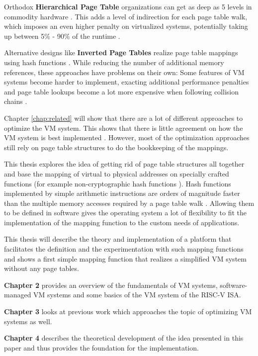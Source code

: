 Orthodox \textbf{Hierarchical Page Table} organizations \cite{tanenbaumOS} can get as deep as 5 levels in commodity hardware \cite{intel5LevelPaging5Level2017}. This adds a level of indirection for each page table walk, which imposes an even higher penalty on virtualized systems, potentially taking up between 5\% - 90\% of the runtime \cite{yaniv2016hash}.

Alternative designs like \textbf{Inverted Page Tables} realize page table mappings using hash functions \cite{tanenbaumOS}. While reducing the number of additional memory references, these approaches have problems on their own: Some features of VM systems become harder to implement, exacting additional performance penalties \cite{yaniv2016hash} and page table lookups become a lot more expensive when following collision chains \cite{jacob1998look}.

Chapter \ref{chap:related} will show that there are a lot of different approaches to optimize the VM system.
This shows that there is little agreement on how the VM system is best implemented \cite{jacob1998look}.
However, most of the optimization approaches still rely on page table structures to do the bookkeeping of the mappings.

This thesis explores the idea of getting rid of page table structures all together and base the mapping of virtual to physical addresses on specially crafted functions (for example non-cryptographic hash functions \cite{mittelbach2021non}).
Hash functions implemented by simple arithmetic instructions are orders of magnitude faster than the multiple memory accesses required by a page table walk \cite{tanenbaumOS}. Allowing them to be defined in software gives the operating system a lot of flexibility to fit the implementation of the mapping function to the custom needs of applications.

This thesis will describe the theory and implementation of a platform that facilitates the definition and the experimentation with such mapping functions and shows a first simple mapping function that realizes a simplified VM system without any page tables.


\textbf{Chapter 2} provides an overview of the fundamentals of VM systems, software-managed VM systems and some basics of the VM system of the RISC-V ISA.

\textbf{Chapter 3} looks at previous work which approaches the topic of optimizing VM systems as well.

\textbf{Chapter 4} describes the theoretical development of the idea presented in this paper and thus provides the foundation for the implementation.

